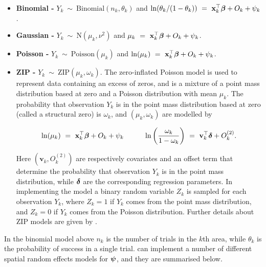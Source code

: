 \documentclass[article,shortnames,nojss]{jss}
\newcommand{\bd}[1]{\ensuremath{\mbox{\boldmath $#1$}}}
\begin{document}
\begin{itemize}
\item \textbf{Binomial - } $Y_{k}~\sim~\mbox{Binomial}(n_{k}, \theta_{k})$ and $\ln(\theta_{k}/(1-\theta_{k}))~=~\mathbf{x}_{k}^{\top}\bd{\beta} + O_{k} + \psi_{k}$. 

\item \textbf{Gaussian - } $Y_{k}~\sim~\mbox{N}(\mu_{k}, \nu^{2})$ and $\mu_{k}~=~\mathbf{x}_{k}^{\top}\bd{\beta} + O_{k} + \psi_{k}$. 

\item \textbf{Poisson - } $Y_{k}~\sim~\mbox{Poisson}(\mu_{k})$ and $\ln(\mu_{k})~=~\mathbf{x}_{k}^{\top}\bd{\beta} + O_{k} + \psi_{k}$. 

\item \textbf{ZIP - } $Y_{k}~\sim~\mbox{ZIP}(\mu_{k}, \omega_k)$. The zero-inflated Poisson model is used to represent data containing an excess of zeros, and is a mixture of a point mass distribution based at zero and a Poisson distribution with mean $\mu_{k}$. The probability that observation $Y_k$ is in the point mass distribution based at zero (called a structural zero) is $\omega_k$, and $(\mu_k, \omega_k)$ are modelled by

$$\ln(\mu_{k})~=~\mathbf{x}_{k}^{\top}\bd{\beta} + O_{k} + \psi_{k}\hspace{1cm}
\ln\left(\frac{\omega_k}{1-\omega_k}\right)~=~\mathbf{v}_{k}^{\top}\bd{\delta} + O^{(2)}_{k}.$$

Here $(\mathbf{v}_{k}, O^{(2)}_{k})$ are respectively covariates and an offset term that determine the probability that observation $Y_k$ is in the point mass distribution, while $\bd{\delta}$ are the corresponding regression parameters. In implementing the model a binary random variable $Z_k$ is sampled for each observation $Y_k$, where $Z_k=1$ if $Y_k$ comes from the point mass distribution, and $Z_k=0$ if $Y_k$ comes from the Poisson distribution. Further details about ZIP models are given by \cite{ugarte2004}.
\end{itemize}

In the binomial model above $n_k$ is the number of trials in the $k$th area, while $\theta_k$ is the probability of success in a single trial.    can implement a number of different spatial random effects models for $\bd{\psi}$, and they are summarised below.
\end{document}
